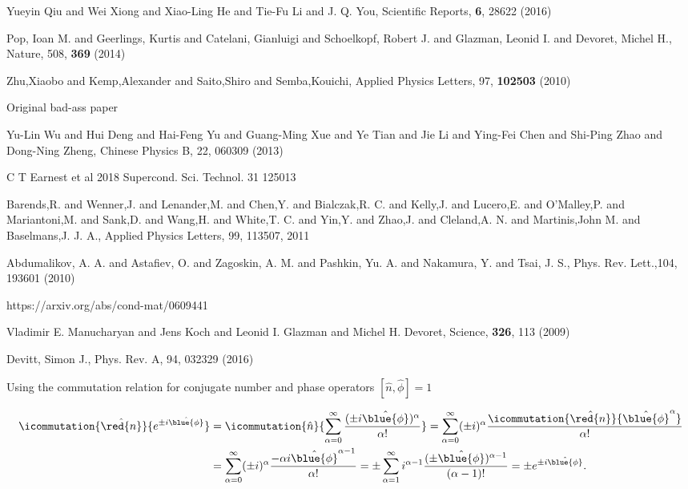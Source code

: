 \begin{thebibliography}{99}
 Yueyin Qiu and Wei Xiong and  Xiao-Ling He and Tie-Fu Li and J.
  Q. You, Scientific Reports, \textbf{6}, 28622 (2016)

 Pop, Ioan M. and  Geerlings, Kurtis and Catelani, Gianluigi and
  Schoelkopf, Robert  J. and Glazman, Leonid  I. and Devoret, Michel  H., Nature,
  508, \textbf{369} (2014)


   Zhu,Xiaobo    and   Kemp,Alexander   and    Saito,Shiro   and
  Semba,Kouichi, Applied Physics Letters, 97, \textbf{102503} (2010)


 Original bad-ass paper


 {Yu-Lin Wu  and Hui Deng and Hai-Feng Yu  and Guang-Ming Xue and
    Ye Tian and Jie Li and Ying-Fei  Chen and Shi-Ping Zhao and Dong-Ning Zheng},
  {Chinese Physics B}, {22}, {060309} (2013)

 C T Earnest et al 2018 Supercond. Sci. Technol. 31 125013
  
 {Barends,R.   and Wenner,J.   and Lenander,M.   and Chen,Y.
    and  Bialczak,R.   C.  and  Kelly,J.   and  Lucero,E.  and  O'Malley,P.   and
    Mariantoni,M.  and  Sank,D.  and  Wang,H. and White,T.   C.  and  Yin,Y.  and
    Zhao,J.  and  Cleland,A.  N.  and  Martinis,John M. and Baselmans,J.  J. A.},
  {Applied Physics Letters}, 99, {113507}, {2011}

 {Abdumalikov,  A.  A.  and Astafiev,  O.  and Zagoskin,
    A.  M.    and  Pashkin,  Yu.   A.  and  Nakamura,   Y.  and  Tsai,   J.  S.},
  {Phys. Rev. Lett.},104, {193601} (2010)

 https://arxiv.org/abs/cond-mat/0609441

 {Vladimir  E. Manucharyan and  Jens Koch and  Leonid I.
    Glazman and Michel H. Devoret}, {Science}, \textbf{326}, 113 (2009)

 Devitt, Simon J., Phys. Rev. A, {94}, {032329} (2016)

 Using  the commutation  relation for  conjugate number  and phase
  operators $ \left[\hat{n},\hat{\phi}\right] = 1 $
 
  {\scriptsize\begin{equation}\label{eq:ab1}
      \begin{aligned}
        \icommutation{\hat{\red{n}}}{e^{\pm i \hat{\blue{\phi}}}} & =  \icommutation{\hat{n}}{\sum_{\alpha = 0}^{\infty} \frac{(\pm i\hat{\blue{\phi}})^\alpha}{\alpha!}} = \sum_{\alpha = 0}^{\infty} (\pm i)^\alpha\frac{\icommutation{\hat{\red{n}}}{\hat{\blue{\phi}}^\alpha}}{\alpha!}\\
        & = \sum_{\alpha  = 0}^{\infty} (\pm i)^\alpha\frac{-\alpha i\hat{\blue{\phi}}^{\alpha -  1}}{\alpha!}  = \pm
        \sum_{\alpha = 1}^{\infty}i^{\alpha - 1}\frac{(\pm\hat{\blue{\phi}})^{\alpha - 1}}{(\alpha - 1)!}  = \pm
        e^{\pm i\hat{\blue{\phi}}}.
      \end{aligned}
    \end{equation}}
 

\end{thebibliography}
